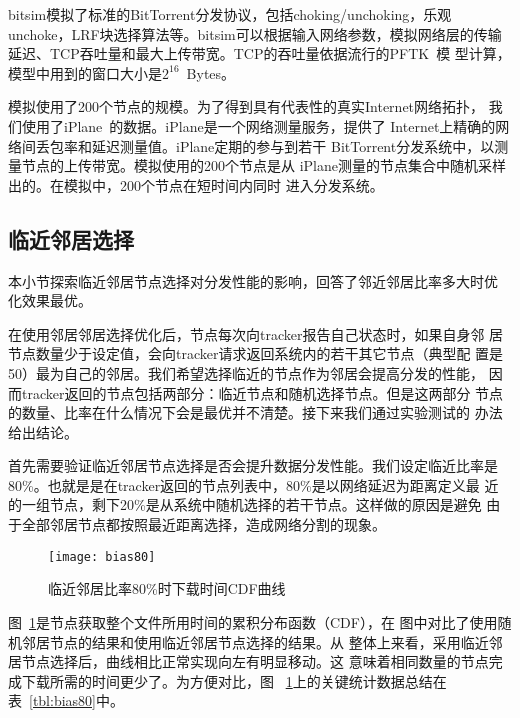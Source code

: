 bitsim模拟了标准的BitTorrent分发协议，包括choking/unchoking，乐观
unchoke，LRF块选择算法等。bitsim可以根据输入网络参数，模拟网络层的传输
延迟、TCP吞吐量和最大上传带宽。TCP的吞吐量依据流行的PFTK~\cite{pftk}模
型计算，模型中用到的窗口大小是$2^{16}$~Bytes。

模拟使用了200个节点的规模。为了得到具有代表性的真实Internet网络拓扑，
我们使用了iPlane~\cite{iplane}的数据。iPlane是一个网络测量服务，提供了
Internet上精确的网络间丢包率和延迟测量值。iPlane定期的参与到若干
BitTorrent分发系统中，以测量节点的上传带宽。模拟使用的200个节点是从
iPlane测量的节点集合中随机采样出的。在模拟中，200个节点在短时间内同时
进入分发系统。



\subsection{临近邻居选择}


本小节探索临近邻居节点选择对分发性能的影响，回答了邻近邻居比率多大时优
化效果最优。

在使用邻居邻居选择优化后，节点每次向tracker报告自己状态时，如果自身邻
居节点数量少于设定值，会向tracker请求返回系统内的若干其它节点（典型配
置是50）最为自己的邻居。我们希望选择临近的节点作为邻居会提高分发的性能，
因而tracker返回的节点包括两部分：临近节点和随机选择节点。但是这两部分
节点的数量、比率在什么情况下会是最优并不清楚。接下来我们通过实验测试的
办法给出结论。

首先需要验证临近邻居节点选择是否会提升数据分发性能。我们设定临近比率是
80\%。也就是是在tracker返回的节点列表中，80\%是以网络延迟为距离定义最
近的一组节点，剩下20\%是从系统中随机选择的若干节点。这样做的原因是避免
由于全部邻居节点都按照最近距离选择，造成网络分割的现象。

\begin{figure}[htbp]
  \centering
  \begin{minipage}{0.6\linewidth}
    \centering
    \texttt{[image: bias80]}
    \caption{临近邻居比率80\%时下载时间CDF曲线}
    \label{fig:bias80}
  \end{minipage}
\end{figure}

图~\ref{fig:bias80}是节点获取整个文件所用时间的累积分布函数（CDF），在
图中对比了使用随机邻居节点的结果和使用临近邻居节点选择的结果。从
整体上来看，采用临近邻居节点选择后，曲线相比正常实现向左有明显移动。这
意味着相同数量的节点完成下载所需的时间更少了。为方便对比，图~
\ref{fig:bias80}上的关键统计数据总结在表~\ref{tbl:bias80}中。

